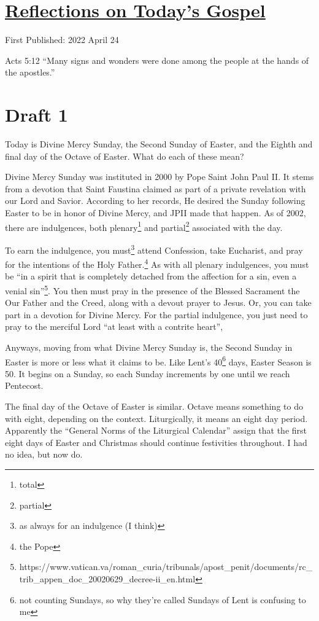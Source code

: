\documentclass[12pt]{article}[titlepage]
\newcommand{\say}[1]{``#1''}
\newcommand{\1}{\={a}}
\newcommand{\2}{\={e}}
\newcommand{\3}{\={\i}}
\newcommand{\4}{\=o}
\newcommand{\5}{\=u}
\newcommand{\6}{\={A}}
\renewcommand{\,}{\textsuperscript{,}}
\begin{document}
\doublespacing
\section{\href{reflections-on-readings-divine-mercy-c-2022.html}{Reflections on Today's Gospel}}
First Published: 2022 April 24

Acts 5:12 \say{Many signs and wonders were done among the people
at the hands of the apostles.}

\section{Draft 1}
Today is Divine Mercy Sunday, the Second Sunday of Easter, and the Eighth and final day of the Octave of Easter.
What do each of these mean?

Divine Mercy Sunday was instituted in 2000 by Pope Saint John Paul II.
It stems from a devotion that Saint Faustina claimed as part of a private revelation with our Lord and Savior.
According to her records, He desired the Sunday following Easter to be in honor of Divine Mercy, and JPII made that happen.
As of 2002, there are indulgences, both plenary\footnote{total} and partial\footnote{partial} associated with the day.

To earn the indulgence, you must\footnote{as always for an indulgence (I think)} attend Confession, take Eucharist, and pray for the intentions of the Holy Father.\footnote{the Pope}
As with all plenary indulgences, you must be \say{in a spirit that is completely detached from the affection for a sin, even a venial sin}\footnote{https://www.vatican.va/roman_curia/tribunals/apost_penit/documents/rc_trib_appen_doc_20020629_decree-ii_en.html}.
You then must pray in the presence of the Blessed Sacrament the Our Father and the Creed, along with a devout prayer to Jesus.
Or, you can take part in a devotion for Divine Mercy.
For the partial indulgence, you just need to pray to the merciful Lord \say{at least with a contrite heart},

Anyways, moving from what Divine Mercy Sunday is, the Second Sunday in Easter is more or less what it claims to be.
Like Lent's 40\footnote{not counting Sundays, so why they're called Sundays of Lent is confusing to me} days, Easter Season is 50.
It begins on a Sunday, so each Sunday increments by one until we reach Pentecost.

The final day of the Octave of Easter is similar.
Octave means something to do with eight, depending on the context.
Liturgically, it means an eight day period.
Apparently the \say{General Norms of the Liturgical Calendar} assign that the first eight days of Easter and Christmas should continue festivities throughout.
I had no idea, but now do.
\end{document}

